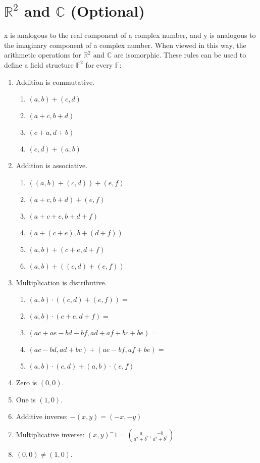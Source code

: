 \section{$\mathbb{R}^2$ and $\mathbb{C}$ (Optional)}

x is analogous to the real component of a complex number,
and y is analogous to the imaginary component of a complex number.
When viewed in this way, the arithmetic operations for $\mathbb{R}^2$ and $\mathbb{C}$
are isomorphic. These rules can be used to define a field structure $\mathbb{F}^2$ for every $\mathbb{F}$:
\begin{enumerate}
    \item Addition is commutative.
    \begin{enumerate}
        \item $(a, b) + (c, d)$
        \item $(a+c, b+d)$
        \item $(c+a, d+b)$
        \item $(c, d) + (a, b)$
    \end{enumerate}   
    \item Addition is associative.
    \begin{enumerate}
        \item $((a, b) + (c, d)) + (e, f)$
        \item $(a+c, b+d) + (e, f)$
        \item $(a+c+e, b+d+f)$
        \item $(a+(c+e), b+(d+f))$
        \item $(a, b) + (c+e, d+f)$
        \item $(a, b) + ((c, d) + (e, f))$
    \end{enumerate}
    \item Multiplication is distributive.
    \begin{enumerate}
        \item $(a, b) \cdot ((c, d) + (e, f)) =$
        \item $(a, b) \cdot (c+e, d+f) =$
        \item $(ac+ae-bd-bf, ad+af+bc+be) =$
        \item $(ac-bd, ad+bc) + (ae-bf, af+be) =$
        \item $(a, b) \cdot (c, d) + (a, b) \cdot (e, f)$
    \end{enumerate}
    \item Zero is $(0, 0)$.
    \item One is $(1, 0)$.
    \item Additive inverse: $-(x,y) = (-x, -y)$
    \item Multiplicative inverse: $(x,y)^-1 = (\frac{a}{a^2+b^2}, \frac{-b}{a^2+b^2})$
    \item $(0, 0) \neq (1, 0)$.
\end{enumerate}